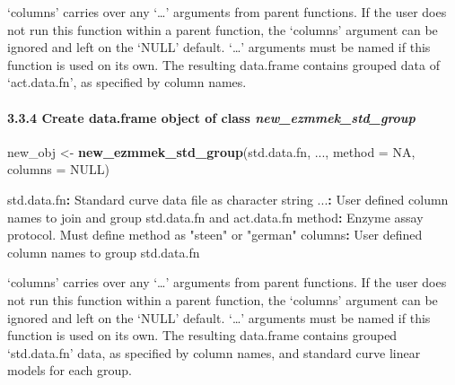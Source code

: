 \documentclass[
]{article}
\newenvironment{Shaded}{\begin{snugshade}}{\end{snugshade}}
\newcommand{\DataTypeTok}[1]{\textcolor[rgb]{0.13,0.29,0.53}{#1}}
\newcommand{\KeywordTok}[1]{\textcolor[rgb]{0.13,0.29,0.53}{\textbf{#1}}}
\newcommand{\NormalTok}[1]{#1}
\newcommand{\OperatorTok}[1]{\textcolor[rgb]{0.81,0.36,0.00}{\textbf{#1}}}
\newcommand{\OtherTok}[1]{\textcolor[rgb]{0.56,0.35,0.01}{#1}}
\newcommand{\StringTok}[1]{\textcolor[rgb]{0.31,0.60,0.02}{#1}}
\begin{document}
`columns' carries over any `\ldots{}' arguments from parent functions.
If the user does not run this function within a parent function, the
`columns' argument can be ignored and left on the `NULL' default.
`\ldots{}' arguments must be named if this function is used on its own.
The resulting data.frame contains grouped data of `act.data.fn', as
specified by column names.

\hypertarget{create-data.frame-object-of-class-new_ezmmek_std_group}{%
\paragraph{\texorpdfstring{3.3.4 Create data.frame object of class
\emph{new\_ezmmek\_std\_group}}{3.3.4 Create data.frame object of class new\_ezmmek\_std\_group}}\label{create-data.frame-object-of-class-new_ezmmek_std_group}}

\begin{Shaded}
\begin{Highlighting}[]
\NormalTok{new\_obj <{-}}\StringTok{ }\KeywordTok{new\_ezmmek\_std\_group}\NormalTok{(std.data.fn,}
\NormalTok{                                ...,}
                                \DataTypeTok{method =} \OtherTok{NA}\NormalTok{,}
                                \DataTypeTok{columns =} \OtherTok{NULL}\NormalTok{)}
\end{Highlighting}
\end{Shaded}

\begin{Shaded}
\begin{Highlighting}[]
\NormalTok{std.data.fn}\OperatorTok{:}\StringTok{ }\NormalTok{Standard curve data file as character string}
\NormalTok{...}\OperatorTok{:}\StringTok{ }\NormalTok{User defined column names to join and group std.data.fn and act.data.fn}
\NormalTok{method}\OperatorTok{:}\StringTok{ }\NormalTok{Enzyme assay protocol. Must define method as }\StringTok{\textquotesingle{}"steen"\textquotesingle{}}\NormalTok{ or }\StringTok{\textquotesingle{}"german"\textquotesingle{}}
\NormalTok{columns}\OperatorTok{:}\StringTok{ }\NormalTok{User defined column names to group std.data.fn}
\end{Highlighting}
\end{Shaded}

`columns' carries over any `\ldots{}' arguments from parent functions.
If the user does not run this function within a parent function, the
`columns' argument can be ignored and left on the `NULL' default.
`\ldots{}' arguments must be named if this function is used on its own.
The resulting data.frame contains grouped `std.data.fn' data, as
specified by column names, and standard curve linear models for each
group.
\end{document}

